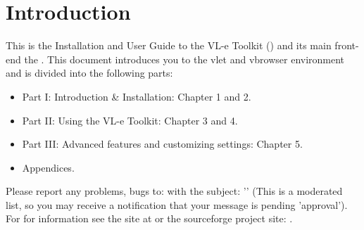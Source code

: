 \chapter{Introduction}
\label{sec:Introduction}




This is the Installation and User Guide to the VL-e Toolkit (\vlet) and its
main front-end the \vbrowser. 
This document introduces you to the vlet and vbrowser 
environment and is divided into the following parts: 

\begin{itemize} 
  \item 
    Part I: Introduction \& Installation: Chapter 1 and 2.
  \item 
    Part II: Using the VL-e Toolkit: Chapter 3 and 4. 
  \item
    Part III: Advanced features and customizing settings: Chapter 5.  
  \item
    Appendices.  
\end{itemize} 

Please report any problems, bugs to:  with the subject: 
'' (This is a moderated list, so you may receive a
notification that your message is pending 'approval'). \\
For for information see the site at  or the
sourceforge project site: .


